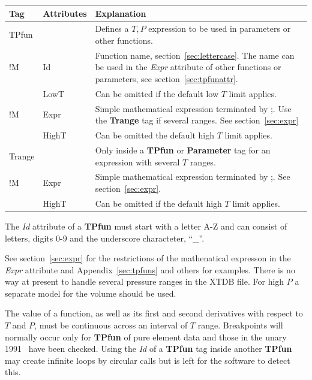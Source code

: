 \documentclass{article}
\begin{document}
\begin{tabular}{|p{} p{} p{}|}\hline
  Tag & Attributes & Explanation\\\hline

  TPfun & & Defines a $T, P$ expression to be used in parameters or other functions.\\
!M      & Id & Function name, section~\ref{sec:lettercase}.  
               The name can be used in the {\em Expr} attribute of other 
               functions or parameters, see section~\ref{sec:tpfunattr}.\\
        & LowT & Can be omitted if the default low $T$ limit applies.\\
!M      & Expr &  Simple mathematical expression terminated by ;.  Use the
             {\bf Trange} tag if several ranges.  See section~\ref{sec:expr}\\
        & HighT & Can be omitted the default high $T$ limit applies.\\\hline

  Trange & & Only inside a {\bf TPfun} or {\bf Parameter} tag 
             for an expression with several $T$ ranges.\\ 
!M       & Expr & Simple mathematical expression terminated by ;.  
                  See section~\ref{sec:expr}.\\
         & HighT & Can be omitted if the default high $T$ limit applies.\\\hline
\end{tabular}

The {\em Id} attribute of a {\bf TPfun} must start with a letter A-Z
and can consist of letters, digits 0-9 and the underscore characteter,
``\_''.

See section~\ref{sec:expr} for the restrictions of the mathenatical
expresson in the {\em Expr} attribute and Appendix~\ref{sec:tpfuns}
and others for examples.  There is no way at present to handle several
pressure ranges in the XTDB file.  For high $P$ a separate model for
the volume should be used.

The value of a function, as well as its first and second derivatives
with respect to $T$ and $P$, must be continuous across an interval of
$T$ range.  Breakpoints will normally occur only for {\bf TPfun} of
pure element data and those in the unary 1991~\cite{91Din} have been
checked.  Using the {\em Id} of a {\bf TPfun} tag inside another {\bf
  TPfun} may create infinite loops by circular calls but is left for
the software to detect this.
\end{document}
